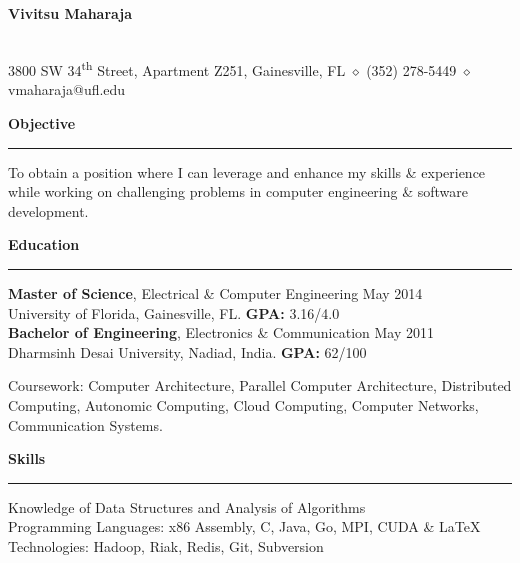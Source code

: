 \documentclass[10pt]{article}
\begin{document}
\begin{center}
\textbf{\Large Vivitsu Maharaja}
\date{}
\smallskip \\
3800 SW 34\textsuperscript{th} Street, Apartment Z251, Gainesville, FL $\diamond$ (352) 278-5449 $\diamond$ vmaharaja@ufl.edu
\end{center}

\textbf{Objective}
\smallskip
\hrule
To obtain a position where I can leverage and enhance my skills \& experience while working on challenging problems in computer engineering \& software development.

\textbf{Education}
\smallskip
\hrule
{\bf Master of Science}, Electrical \& Computer Engineering \hfill May 2014\\
University of Florida, Gainesville, FL. {\bf GPA:} 3.16/4.0 \\
{\bf Bachelor of Engineering}, Electronics \& Communication \hfill May 2011\\
Dharmsinh Desai University, Nadiad, India. {\bf GPA:} 62/100

Coursework: Computer Architecture, Parallel Computer Architecture, Distributed Computing, Autonomic Computing, Cloud Computing, Computer Networks, Communication Systems.

\textbf{Skills}
\smallskip
\hrule
Knowledge of Data Structures and Analysis of Algorithms\\
Programming Languages: x86 Assembly, C, Java, Go, MPI, CUDA \& \LaTeX\ \\
Technologies: Hadoop, Riak, Redis, Git, Subversion
\end{document}
